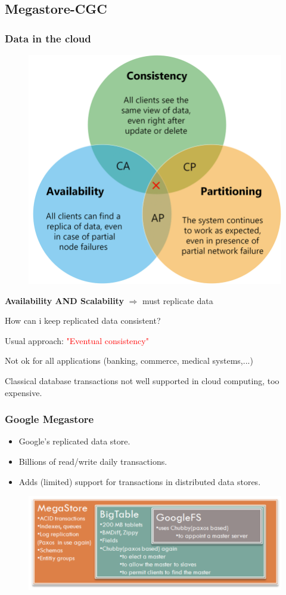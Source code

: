 \documentclass{beamer}
\begin{document}
\subsection{Megastore-CGC}
\begin{frame}
    \frametitle{Data in the cloud}
\begin{figure}
    \includegraphics[width=.7\textwidth]{img/cap.png}
\end{figure}
\end{frame}
\begin{frame}
    \textbf{Availability AND Scalability} $\Rightarrow$ must replicate data

    How can i keep replicated data consistent?
    
    \bigskip
    Usual approach: \textcolor{red}{"Eventual consistency"}

    \bigskip
    Not ok for all applications (banking, commerce, medical systems,...)

    \bigskip
    Classical database transactions not well supported  in cloud computing, too expensive.
\end{frame}
\begin{frame}
    \frametitle{Google Megastore}
    \begin{itemize}
        \item Google's replicated data store.
        \item Billions  of read/write daily transactions.
        \item Adds (limited) support for transactions  in distributed data stores.   
    \end{itemize}
    \begin{figure}
        \includegraphics[width=\textwidth]{img/megastore.png}
    \end{figure}
\end{frame}
\end{document}
